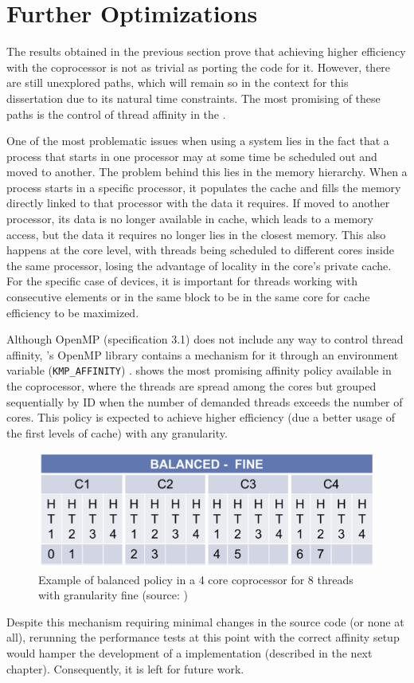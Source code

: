 \documentclass[../thesis]{subfiles}
\begin{document}
	\section{Further Optimizations}
	\label{sec:mic:further}

	The results obtained in the previous section prove that achieving higher efficiency with the coprocessor is not as trivial as porting the code for it. However, there are still unexplored paths, which will remain so in the context for this dissertation due to its natural time constraints. The most promising of these paths is the control of thread affinity in the \intel\xeonphi.

	One of the most problematic issues when using a \numa system lies in the fact that a process that starts in one processor may at some time be scheduled out and moved to another. The problem behind this lies in the memory hierarchy. When a process starts in a specific processor, it populates the cache and fills the memory directly linked to that processor with the data it requires. If moved to another processor, its data is no longer available in cache, which leads to a memory access, but the data it requires no longer lies in the closest memory. This also happens at the core level, with threads being scheduled to different cores inside the same processor, losing the advantage of locality in the core's private cache. For the specific case of \intel\mic devices, it is important for threads working with consecutive elements or in the same block to be in the same core for cache efficiency to be maximized.

	Although OpenMP (specification 3.1) does not include any way to control thread affinity, \intel's OpenMP library contains a mechanism for it through an environment variable (\texttt{KMP\_AFFINITY}) \cite{PRACE:MIC:BestPracticeGuide,CESGA:MIC:Evaluation}.  shows the most promising affinity policy available in the coprocessor, where the threads are spread among the cores but grouped sequentially by ID when the number of demanded threads exceeds the number of cores. This policy is expected to achieve higher efficiency (due a better usage of the first levels of cache) with any granularity.

	\begin{figure}
		\begin{center}
			\includegraphics[width=\textwidth]{assets/images/kmp_affinity_balanced.png}
		\end{center}
		\caption{Example of balanced policy in a 4 core coprocessor for 8 threads with granularity fine (source: \cite{CESGA:MIC:Evaluation})}
		\label{fig:kmp_affinity:balanced}
	\end{figure}

	Despite this mechanism requiring minimal changes in the source code (or none at all), rerunning the performance tests at this point with the correct affinity setup would hamper the development of a \cuda implementation (described in the next chapter). Consequently, it is left for future work.
\end{document}
